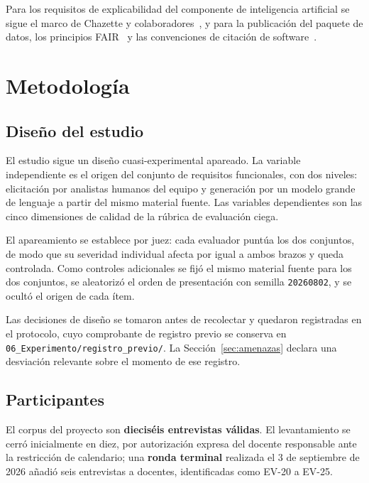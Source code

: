 \documentclass[11pt,a4paper]{article}
\begin{document}
Para los requisitos de explicabilidad del componente de inteligencia artificial se
sigue el marco de Chazette y colaboradores~\cite{chazette2020explainability,%
chazette2021exploring,chazette2022explainable}, y para la publicaci\'on del paquete de
datos, los principios FAIR~\cite{wilkinson2016fair} y las convenciones de citaci\'on de
software~\cite{smith2016software,druskat2021citation}.

\section{Metodolog\'ia}

\subsection{Dise\~no del estudio}

El estudio sigue un dise\~no cuasi-experimental apareado. La variable independiente es
el origen del conjunto de requisitos funcionales, con dos niveles: elicitaci\'on por
analistas humanos del equipo y generaci\'on por un modelo grande de lenguaje a partir
del mismo material fuente. Las variables dependientes son las cinco dimensiones de
calidad de la r\'ubrica de evaluaci\'on ciega.

El apareamiento se establece por juez: cada evaluador punt\'ua los dos conjuntos, de
modo que su severidad individual afecta por igual a ambos brazos y queda controlada.
Como controles adicionales se fij\'o el mismo material fuente para los dos conjuntos, se
aleatoriz\'o el orden de presentaci\'on con semilla \texttt{20260802}, y se ocult\'o el
origen de cada \'item.

Las decisiones de dise\~no se tomaron antes de recolectar y quedaron registradas en el
protocolo, cuyo comprobante de registro previo se conserva en
\texttt{06\_Experimento/registro\_previo/}. La Secci\'on~\ref{sec:amenazas} declara una
desviaci\'on relevante sobre el momento de ese registro.

\subsection{Participantes}

El corpus del proyecto son \textbf{diecis\'eis entrevistas v\'alidas}. El levantamiento
se cerr\'o inicialmente en diez, por autorizaci\'on expresa del docente responsable ante
la restricci\'on de calendario; una \textbf{ronda terminal} realizada el 3 de septiembre
de 2026 a\~nadi\'o seis entrevistas a docentes, identificadas como EV-20 a EV-25.
\end{document}
